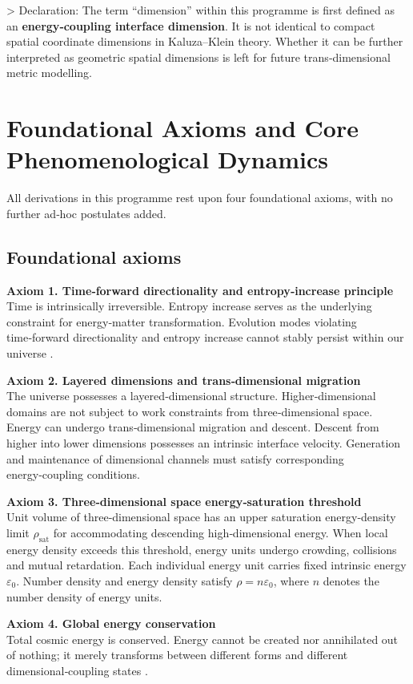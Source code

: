 \documentclass[12pt,a4paper]{article}
\begin{document}
> Declaration: The term ``dimension'' within this programme is first defined as an \textbf{energy‑coupling interface dimension}. It is not identical to compact spatial coordinate dimensions in Kaluza–Klein theory. Whether it can be further interpreted as geometric spatial dimensions is left for future trans‑dimensional metric modelling.

\section{Foundational Axioms and Core Phenomenological Dynamics}
All derivations in this programme rest upon four foundational axioms, with no further ad‑hoc postulates added.

\subsection{Foundational axioms}
\noindent\textbf{Axiom 1. Time‑forward directionality and entropy‑increase principle}\\
Time is intrinsically irreversible. Entropy increase serves as the underlying constraint for energy‑matter transformation. Evolution modes violating time‑forward directionality and entropy increase cannot stably persist within our universe \cite{landau1980}.

\noindent\textbf{Axiom 2. Layered dimensions and trans‑dimensional migration}\\
The universe possesses a layered‑dimensional structure. Higher‑dimensional domains are not subject to work constraints from three‑dimensional space. Energy can undergo trans‑dimensional migration and descent. Descent from higher into lower dimensions possesses an intrinsic interface velocity. Generation and maintenance of dimensional channels must satisfy corresponding energy‑coupling conditions.

\noindent\textbf{Axiom 3. Three‑dimensional space energy‑saturation threshold}\\
Unit volume of three‑dimensional space has an upper saturation energy‑density limit $\rho_{\text{sat}}$ for accommodating descending high‑dimensional energy. When local energy density exceeds this threshold, energy units undergo crowding, collisions and mutual retardation. Each individual energy unit carries fixed intrinsic energy $\varepsilon_0$. Number density and energy density satisfy $\rho = n\varepsilon_0$, where $n$ denotes the number density of energy units.

\noindent\textbf{Axiom 4. Global energy conservation}\\
Total cosmic energy is conserved. Energy cannot be created nor annihilated out of nothing; it merely transforms between different forms and different dimensional‑coupling states \cite{noether1918}.
\end{document}
